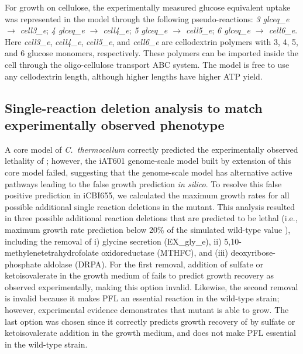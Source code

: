 For growth on cellulose, the experimentally measured glucose equivalent uptake was represented in the model through the following pseudo-reactions:
\textit{3 glceq\_e $\rightarrow$ cell3\_e}; \textit{4 glceq\_e $\rightarrow$ cell4\_e};
\textit{5 glceq\_e $\rightarrow$ cell5\_e}; \textit{6 glceq\_e $\rightarrow$ cell6\_e}.
Here \textit{cell3\_e}, \textit{cell4\_e}, \textit{cell5\_e}, and \textit{cell6\_e} are cellodextrin polymers with 3, 4, 5, and 6 glucose monomers, respectively. These polymers can be imported inside the cell through the oligo-cellulose transport ABC system.
The model is free to use any cellodextrin length, although higher lengths have higher ATP yield. \citep{zhang2005, thompson2016}

\subsection{Single-reaction deletion analysis to match experimentally observed phenotype}\label{sec:deletion_analysis}
A core model of \textit{C.~thermocellum}\citep{thompson2015} correctly predicted the experimentally observed lethality of ; however, the iAT601 genome-scale model built by extension of this core model failed, suggesting that the genome-scale model has alternative active pathways leading to the false growth prediction \textit{in silico}.
To resolve this false positive prediction in iCBI655, we calculated the maximum growth rates for all possible additional single reaction deletions in the  mutant.
This analysis resulted in three possible additional reaction deletions that are predicted to be lethal (i.e., maximum growth rate prediction below 20\% of the simulated wild-type value \citep{palsson2015}), including the removal of i) glycine secretion (EX\_gly\_e), ii) 5,10-methylenetetrahydrofolate oxidoreductase (MTHFC), and (iii) deoxyribose-phosphate aldolase (DRPA).
For the first removal, addition of sulfate or ketoisovalerate in the growth medium of  fails to predict growth recovery as observed experimentally,\citep{thompson2015} making this option invalid.
Likewise, the second removal is invalid because it makes PFL an essential reaction in the wild-type strain; however, experimental evidence demonstrates that  mutant is able to grow.\citep{papanek2015}
The last option was chosen since it correctly predicts growth recovery of  by sulfate or ketoisovalerate addition in the growth medium, and  does not make PFL essential in the wild-type strain.

